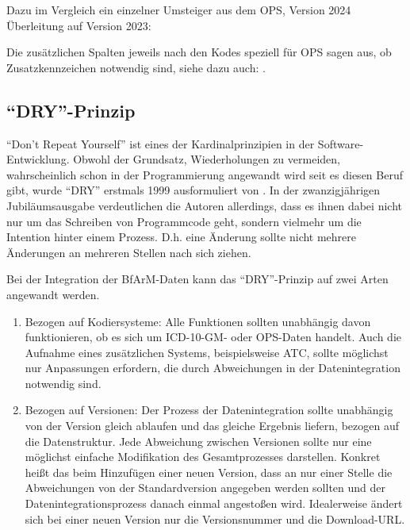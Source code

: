 Dazu im Vergleich ein einzelner Umsteiger aus dem OPS, Version 2024 Überleitung auf Version 2023:


Die zusätzlichen Spalten jeweils nach den Kodes speziell für OPS sagen aus, ob Zusatzkennzeichen notwendig sind, siehe dazu auch: \citep[Kategorie und Kode im OPS]{bfarmopskk}.

\subsection{``DRY''-Prinzip}

``Don't Repeat Yourself'' ist eines der Kardinalprinzipien in der Software-Entwicklung. Obwohl der Grundsatz, Wiederholungen zu vermeiden, wahrscheinlich schon in der Programmierung angewandt wird seit es diesen Beruf gibt, wurde ``DRY'' erstmals 1999 ausformuliert von \citep[Seite 79ff]{thomas2019pragmatic}. In der zwanzigjährigen Jubiläumsausgabe verdeutlichen die Autoren allerdings, dass es ihnen dabei nicht nur um das Schreiben von Programmcode geht, sondern vielmehr um die Intention hinter einem Prozess. D.h. eine Änderung sollte nicht mehrere Änderungen an mehreren Stellen nach sich ziehen. 

\newpage %

Bei der Integration der BfArM-Daten kann das ``DRY''-Prinzip auf zwei Arten angewandt werden.

\begin{enumerate}
\item Bezogen auf Kodiersysteme: Alle Funktionen sollten unabhängig davon funktionieren, ob es sich um ICD-10-GM- oder OPS-Daten handelt. Auch die Aufnahme eines zusätzlichen Systems, beispielsweise ATC, sollte möglichst nur Anpassungen erfordern, die durch Abweichungen in der Datenintegration notwendig sind. 
\item Bezogen auf Versionen: Der Prozess der Datenintegration sollte unabhängig von der Version gleich ablaufen und das gleiche Ergebnis liefern, bezogen auf die Datenstruktur. Jede Abweichung zwischen Versionen sollte nur eine möglichst einfache Modifikation des Gesamtprozesses darstellen. Konkret heißt das beim Hinzufügen einer neuen Version, dass an nur einer Stelle die Abweichungen von der Standardversion angegeben werden sollten und der Datenintegrationsprozess danach einmal angestoßen wird. Idealerweise ändert sich bei einer neuen Version nur die Versionsnummer und die Download-URL. 
\end{enumerate}

